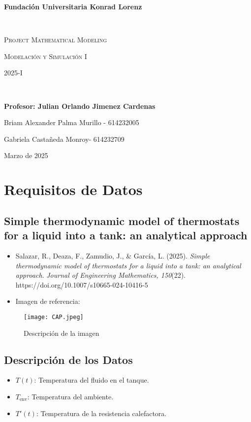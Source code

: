 \documentclass{article}
\begin{document}
\begin{titlepage}
\centering
{\bfseries\LARGE Fundación Universitaria Konrad Lorenz\par}
\vfill
\noindent\hrulefill \\
{\scshape\Huge Project Mathematical Modeling\par}
\vspace{0.5cm}
{\scshape\Large Modelación y Simulación I \par}
\vspace{0.5cm}
{\scshape\Large 2025-I \par} 
\noindent\hrulefill \\
\vfill
{\bfseries\Large Profesor: Julian Orlando Jimenez Cardenas\par}
\vfill
{\Large Briam Alexander Palma Murillo - 614232005\par}
{\Large Gabriela Castañeda Monroy- 614232709\par}
\vfill
{\large Marzo de 2025 \par} 
\end{titlepage}
\setcounter{page}{1}
\section {Requisitos de Datos}
\subsection{Simple thermodynamic model of thermostats for a liquid
into a tank: an analytical approach 
 }
 \begin{itemize}
    \item Salazar, R., Deaza, F., Zamudio, J., \& García, L. (2025). \textit{Simple thermodynamic model of thermostats for a liquid into a tank: an analytical approach}. \textit{Journal of Engineering Mathematics, 150}(22). https://doi.org/10.1007/s10665-024-10416-5
    \item Imagen de referencia:
\end{itemize}

\begin{figure}[h]
    \centering
    \texttt{[image: CAP.jpeg]}
    \caption{Descripción de la imagen}
    \label{fig:cap}
\end{figure}
 \subsection{Descripción de los Datos}
\begin{itemize} 

    \item \( T(t) \): Temperatura del fluido en el tanque.
    \item \( T_{\text{env}} \): Temperatura del ambiente.
    \item \( T'(t) \): Temperatura de la resistencia calefactora.
\end{itemize}
\end{document}
